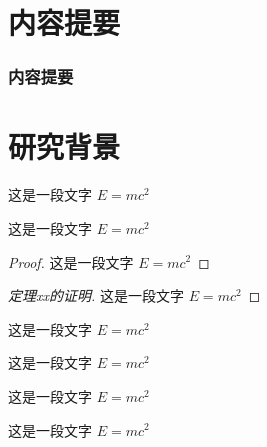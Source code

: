 \documentclass{whu-beamer}
\begin{document}
\maketitle


\section{内容提要}

\begin{frame}
  \frametitle{内容提要}
  \tableofcontents[hideallsubsections]
\end{frame}



\section{研究背景}

\begin{frame}
  \begin{definition}
    这是一段文字 $E = m c^2$
  \end{definition}
  
  \begin{theorem}
    这是一段文字 $E = m c^2$
  \end{theorem}
  
  
  \begin{proof}
    这是一段文字 $E = m c^2$
  \end{proof}
  
  \begin{proof}[定理xx的证明]
    这是一段文字 $E = m c^2$
  \end{proof}
  
\end{frame}

\begin{frame}
  \begin{example}
    这是一段文字 $E = m c^2$
  \end{example}
  
  \begin{property}
    这是一段文字 $E = m c^2$
  \end{property}
  
  \begin{proposition}
    这是一段文字 $E = m c^2$
  \end{proposition}
  
  \begin{corollary}
    这是一段文字 $E = m c^2$
  \end{corollary}
\end{frame}
\end{document}
